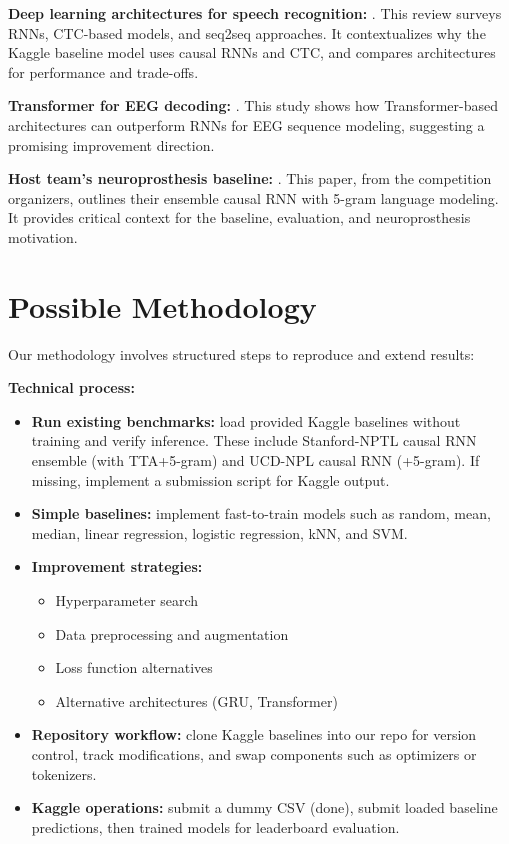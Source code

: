 \documentclass[10pt,twocolumn,letterpaper]{article}
\begin{document}
\textbf{Deep learning architectures for speech recognition:} \cite{papastratis_speech_2021}.  
This review surveys RNNs, CTC-based models, and seq2seq approaches.  
It contextualizes why the Kaggle baseline model uses causal RNNs and CTC, and compares architectures for performance and trade-offs.  

\textbf{Transformer for EEG decoding:} \cite{lee_eeg-transformer_2021}.  
This study shows how Transformer-based architectures can outperform RNNs for EEG sequence modeling, suggesting a promising improvement direction.  

\textbf{Host team’s neuroprosthesis baseline:} \cite{card_accurate_2024}.  
This paper, from the competition organizers, outlines their ensemble causal RNN with 5-gram language modeling.  
It provides critical context for the baseline, evaluation, and neuroprosthesis motivation.  

\section{Possible Methodology}
Our methodology involves structured steps to reproduce and extend results:  

\textbf{Technical process:}
\begin{itemize}
    \item \textbf{Run existing benchmarks:} load provided Kaggle baselines without training and verify inference.  
    These include Stanford-NPTL causal RNN ensemble (with TTA+5-gram) and UCD-NPL causal RNN (+5-gram).  
    If missing, implement a submission script for Kaggle output.  
    \item \textbf{Simple baselines:} implement fast-to-train models such as random, mean, median, linear regression, logistic regression, kNN, and SVM.  
    \item \textbf{Improvement strategies:} 
    \begin{itemize}
        \item Hyperparameter search  
        \item Data preprocessing and augmentation  
        \item Loss function alternatives  
        \item Alternative architectures (GRU, Transformer)  
    \end{itemize}
    \item \textbf{Repository workflow:} clone Kaggle baselines into our repo for version control, track modifications, and swap components such as optimizers or tokenizers.  
    \item \textbf{Kaggle operations:} submit a dummy CSV (done), submit loaded baseline predictions, then trained models for leaderboard evaluation.  
\end{itemize}
\end{document}
